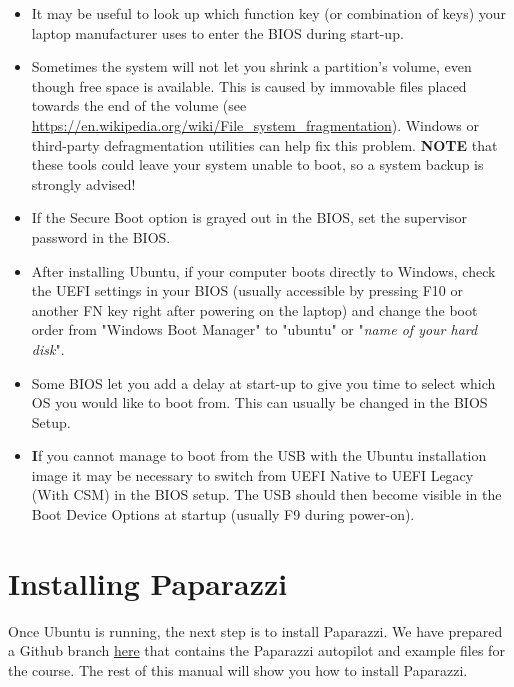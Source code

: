 \begin{itemize}
  \item It may be useful to look up which function key (or combination of keys) your laptop manufacturer uses to enter the BIOS during start-up.
  
  \item Sometimes the system will not let you shrink a partition's volume, even though free space is available. This is caused by immovable files placed towards the end of the volume (see \url{https://en.wikipedia.org/wiki/File\_system\_fragmentation}). Windows or third-party defragmentation utilities can help fix this problem. \textbf{NOTE} that these tools could leave your system unable to boot, so a system backup is strongly advised!
  
  \item If the Secure Boot option is grayed out in the BIOS, set the supervisor password in the BIOS.
  
  \item After installing Ubuntu, if your computer boots directly to Windows, check the UEFI settings in your BIOS (usually accessible by pressing F10 or another FN key right after powering on the laptop) and change the boot order from "Windows Boot Manager" to "ubuntu" or "\textit{name of your hard disk}".
  
  \item Some BIOS let you add a delay at start-up to give you time to select which OS you would like to boot from. This can usually be changed in the BIOS Setup.
  
  \item \textbf If you cannot manage to boot from the USB with the Ubuntu installation image it may be necessary to switch from UEFI Native to UEFI Legacy (With CSM) in the BIOS setup. The USB should then become visible in the Boot Device Options at startup (usually F9 during power-on).
\end{itemize}


\section{Installing Paparazzi}\label{sec:install}
Once Ubuntu is running, the next step is to install Paparazzi.
We have prepared a Github branch \href{https://github.com/tudelft/paparazzi/tree/\coursebranch}{here} that contains the Paparazzi autopilot and example files for the course. The rest of this manual will show you how to install Paparazzi.

